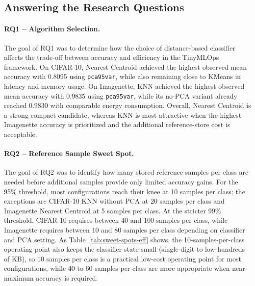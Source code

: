 \documentclass[sigconf,review]{acmart}
\begin{document}
\subsection{Answering the Research Questions}
\paragraph{RQ1 -- Algorithm Selection.}
The goal of RQ1 was to determine how the choice of distance-based classifier affects the trade-off between accuracy and efficiency in the TinyMLOps framework.
On CIFAR-10, Nearest Centroid achieved the highest observed mean accuracy with 0.8095 using \texttt{pca95var}, while also remaining close to KMeans in latency and memory usage.
On Imagenette, KNN achieved the highest observed mean accuracy with 0.9835 using \texttt{pca95var}, while its no-PCA variant already reached 0.9830 with comparable energy consumption.
Overall, Nearest Centroid is a strong compact candidate, whereas KNN is most attractive when the highest Imagenette accuracy is prioritized and the additional reference-store cost is acceptable.

\paragraph{RQ2 -- Reference Sample Sweet Spot.}
The goal of RQ2 was to identify how many stored reference samples per class are needed before additional samples provide only limited accuracy gains.
For the 95\% threshold, most configurations reach their knee at 10 samples per class; the exceptions are CIFAR-10 KNN without PCA at 20 samples per class and Imagenette Nearest Centroid at 5 samples per class.
At the stricter 99\% threshold, CIFAR-10 requires between 40 and 100 samples per class, while Imagenette requires between 10 and 80 samples per class depending on classifier and PCA setting.
As Table~\ref{tab:sweet-spots-eff} shows, the 10-samples-per-class operating point also keeps the classifier state small (single-digit to low-hundreds of KB), so 10 samples per class is a practical low-cost operating point for most configurations, while 40 to 60 samples per class are more appropriate when near-maximum accuracy is required.
\end{document}
